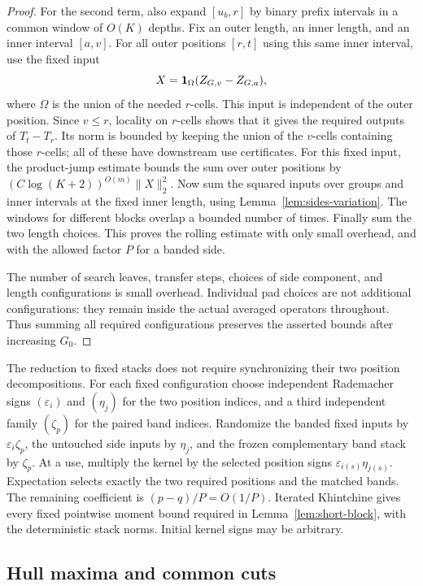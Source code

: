 \begin{proof}
For the second term, also expand $[u_b,r]$ by binary prefix intervals
in a common window of $O(K)$ depths.  Fix an outer length, an inner
length, and an inner interval $[a,v]$.  For all outer positions
$[r,t]$ using this same inner interval, use the fixed input
\[
 X=\mathbf 1_{\Omega}(Z_{G,v}-Z_{G,a}),
\]
where $\Omega$ is the union of the needed $r$-cells.  This input is
independent of the outer position.  Since $v\le r$, locality on
$r$-cells shows that it gives the required outputs of $T_t-T_r$.
Its norm is bounded by keeping the union of the $v$-cells containing
those $r$-cells; all of these have downstream use certificates.
For this fixed input, the product-jump estimate bounds the sum over
outer positions by $(C\log(K+2))^{O(m)}\|X\|_2^2$.
Now sum the squared inputs over groups and inner intervals at the
fixed inner length, using
Lemma~\ref{lem:sides-variation}.  The windows for different blocks
overlap a bounded number of times.  Finally sum the two length
choices.  This proves the rolling estimate with only small overhead,
and with the allowed factor $P$ for a banded side.

The number of search leaves, transfer steps, choices of side
component, and length configurations is small overhead.  Individual
pad choices are not additional configurations: they remain inside
the actual averaged operators throughout.  Thus summing all required
configurations preserves the asserted bounds after increasing
$G_0$.
\end{proof}

The reduction to fixed stacks does not require synchronizing their
two position decompositions.  For each fixed configuration choose
independent Rademacher signs $(\varepsilon_i)$ and $(\eta_j)$ for
the two position indices, and a third independent family $(\zeta_p)$
for the paired band indices.  Randomize the banded fixed inputs by
$\varepsilon_i\zeta_p$, the untouched side inputs by $\eta_j$, and
the frozen complementary band stack by $\zeta_p$.  At a use, multiply
the kernel by the selected position signs
$\varepsilon_{i(s)}\eta_{j(s)}$.  Expectation selects exactly the
two required positions and the matched bands.  The remaining
coefficient is $(p-q)/P=O(1/P)$.  Iterated Khintchine gives every
fixed pointwise moment bound required in
Lemma~\ref{lem:short-block}, with the deterministic stack norms.
Initial kernel signs may be arbitrary.

\subsection{Hull maxima and common cuts}

